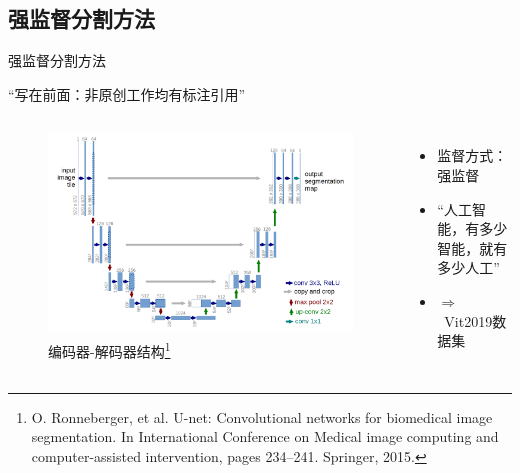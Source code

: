 \subsection{强监督分割方法}
\begin{frame}{强监督分割方法}
\begin{center}
``写在前面：{\color{red}非原创工作均有标注引用}''
\end{center}
\begin{columns}[c]
\begin{figure}
    \centering
    \includegraphics[width=\linewidth]{figures/chap2_Unet.png}
    \caption{编码器-解码器结构\footnote[frame]{\tiny O. Ronneberger, et al. U-net: Convolutional networks for biomedical image segmentation. In International Conference on Medical image computing and computer-assisted intervention, pages 234–241. Springer, 2015.}}
\end{figure}

\begin{itemize}
\item 监督方式：强监督 \pause
\item ``人工智能，有多少智能，就有多少人工''
\item $\Rightarrow$~Vit2019数据集
\end{itemize}
\end{columns}
\end{frame}
